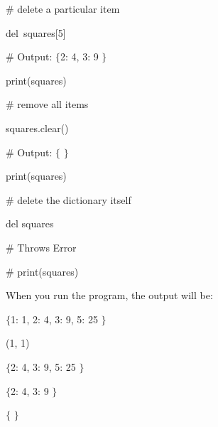 \noindent 
 \hspace*{0.5in}  $  \#  $ delete a particular item \par
\noindent 
 \hspace*{0.5in} del~squares[5]   \par
\vspace{12pt}
\noindent 
 \hspace*{0.5in}  $  \#  $ Output:  $  \{  $2: 4, 3: 9 $  \}  $ \par
\noindent 
 \hspace*{0.5in} print(squares) \par
\vspace{12pt}
\noindent 
 \hspace*{0.5in}  $  \#  $ remove all items \par
\noindent 
 \hspace*{0.5in} squares.clear() \par
\vspace{12pt}
\noindent 
 \hspace*{0.5in}  $  \#  $ Output:  $  \{  $ $  \}  $ \par
\noindent 
 \hspace*{0.5in} print(squares) \par
\vspace{12pt}
\noindent 
 \hspace*{0.5in}  $  \#  $ delete the dictionary itself \par
\noindent 
 \hspace*{0.5in} del squares \par
\vspace{12pt}
\noindent 
 \hspace*{0.5in}  $  \#  $ Throws Error \par
\noindent 
 \hspace*{0.5in}  $  \#  $ print(squares) \par
\noindent 
When you run the program, the output will be: \par
{} \par
\noindent 
 $  \{  $1: 1, 2: 4, 3: 9, 5: 25 $  \}  $ \par
\noindent 
(1, 1) \par
\noindent 
 $  \{  $2: 4, 3: 9, 5: 25 $  \}  $ \par
\noindent 
 $  \{  $2: 4, 3: 9 $  \}  $ \par
\noindent 
 $  \{  $ $  \}  $ \par
\vspace{12pt}
\vspace{12pt}
